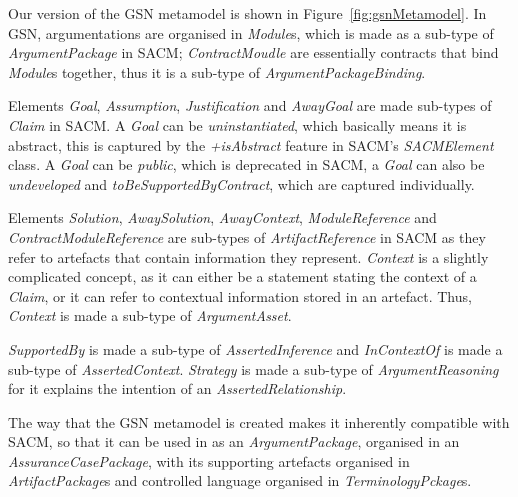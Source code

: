 Our version of the GSN metamodel is shown in Figure~\ref{fig:gsnMetamodel}. 
In GSN, argumentations are organised in \textit{Module}s, which is made as a sub-type of \textit{ArgumentPackage} in SACM; \textit{ContractMoudle} are essentially contracts that bind \textit{Module}s together, thus it is a sub-type of \textit{ArgumentPackageBinding}. 

Elements \textit{Goal}, \textit{Assumption}, \textit{Justification} and \textit{AwayGoal} are made sub-types of \textit{Claim} in SACM. 
A \textit{Goal} can be \textit{uninstantiated}, which basically means it is abstract, this is captured by the \textit{+isAbstract} feature in SACM's \textit{SACMElement} class. 
A \textit{Goal} can be \textit{public}, which is deprecated in SACM, a \textit{Goal} can also be \textit{undeveloped} and \textit{toBeSupportedByContract}, which are captured individually. 

Elements \textit{Solution}, \textit{AwaySolution}, \textit{AwayContext}, \textit{ModuleReference} and \textit{ContractModuleReference} are sub-types of \textit{ArtifactReference} in SACM as they refer to artefacts that contain information they represent. 
\textit{Context} is a slightly complicated concept, as it can either be a statement stating the context of a \textit{Claim}, or it can refer to contextual information stored in an artefact. 
Thus, \textit{Context} is made a sub-type of \textit{ArgumentAsset}. 

\textit{SupportedBy} is made a sub-type of \textit{AssertedInference} and \textit{InContextOf} is made a sub-type of \textit{AssertedContext}. 
\textit{Strategy} is made a sub-type of \textit{ArgumentReasoning} for it explains the intention of an \textit{AssertedRelationship}.

The way that the GSN metamodel is created makes it inherently compatible with SACM, so that it can be used in as an \textit{ArgumentPackage}, organised in an \textit{AssuranceCasePackage}, with its supporting artefacts organised in \textit{ArtifactPackage}s and controlled language organised in \textit{TerminologyPckage}s. 


